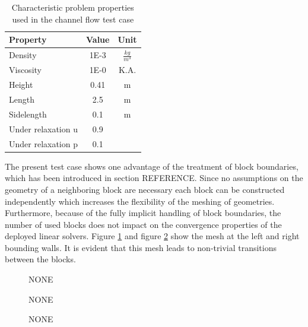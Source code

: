 \begin{table}[h!]\centering
{}
  \begin{tabular}{lcc}\toprule
    Property & Value & Unit \\
    \midrule
    \rowcolor{black!20} Density    & 1E-3 & $\frac{kg}{m^3}$      \\
    \rowcolor{black!00} Viscosity  & 1E-0 & K.A.  \\
    \rowcolor{black!20} Height     & 0.41 & m   \\
    \rowcolor{black!00} Length     & 2.5  & m  \\
    \rowcolor{black!20} Sidelength & 0.1  & m  \\
    \rowcolor{black!00} Under relaxation u & 0.9 &  \\
    \rowcolor{black!20} Under relaxation p & 0.1 &  \\
  \end{tabular}
  \caption{Characteristic problem properties used in the channel flow test case}
  \label{tab:channel}
\end{table}

The present test case shows one advantage of the treatment of block boundaries, which has been introduced in section REFERENCE. Since no assumptions on the geometry of a neighboring block are necessary each block can be constructed independently which increases the flexibility of the meshing of geometries. Furthermore, because of the fully implicit handling of block boundaries, the number of used blocks does not impact on the convergence properties of the deployed linear solvers. Figure \ref{fig:channel1} and figure \ref{fig:channel2} show the mesh at the left and right bounding walls. It is evident that this mesh leads to non-trivial transitions between the blocks.

\begin{figure}
  \centering
  \label{fig:channel1}
  
  \caption{NONE}
\end{figure}

\begin{figure}
  \centering
  \label{fig:channel2}
  
  \caption{NONE}
\end{figure}

\begin{figure}
  \centering
  
  \caption{NONE}
\end{figure}

